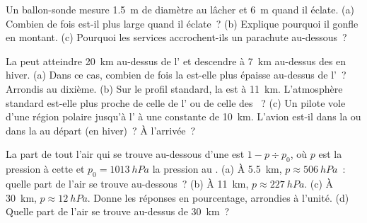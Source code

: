 \begin{exercise}[$\star\star$]\label{exo:g8:the-atmosphere:9}
Un ballon-sonde mesure \qty{1.5}{m} de diamètre au lâcher et \qty{6}{m}
quand il éclate. (a) Combien de fois est-il plus large quand il éclate~?
(b) Explique pourquoi il gonfle en montant. (c) Pourquoi les services
 accrochent-ils un parachute au-dessous~?
\end{exercise}

\begin{exercise}[$\star\star$]\label{exo:g8:the-atmosphere:10}
La  peut atteindre \qty{20}{km} au-dessus de l' et
descendre à \qty{7}{km} au-dessus des  en hiver. (a) Dans ce cas,
combien de fois la  est-elle plus épaisse au-dessus de
l'~? Arrondis au dixième. (b) Sur le profil standard, la
 est à \qty{11}{km}. L'atmosphère standard est-elle plus proche
de celle de l' ou de celle des ~? (c) Un pilote vole d'une
région polaire jusqu'à l' à une  constante de
\qty{10}{km}. L'avion est-il dans la  ou dans la 
au départ (en hiver)~? À l'arrivée~?
\end{exercise}

\begin{exercise}[$\star\star\star$]\label{exo:g8:the-atmosphere:11}
La part de tout l'air qui se trouve au-dessous d'une  est $1 - p \div
p_0$, où $p$ est la pression à cette  et $p_0 =
\qty{1013}{hPa}$ la pression au . (a) À \qty{5.5}{km}, $p
\approx \qty{506}{hPa}$~: quelle part de l'air se trouve au-dessous~? (b) À
\qty{11}{km}, $p \approx \qty{227}{hPa}$. (c) À \qty{30}{km}, $p \approx
\qty{12}{hPa}$. Donne les réponses en pourcentage, arrondies à l'unité.
(d) Quelle part de l'air se trouve au-dessus de \qty{30}{km}~?
\end{exercise}

